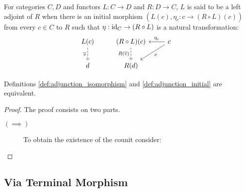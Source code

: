 \begin{definition}
  For categories $C,D$ and functors $L: C\to D$ and $R: D\to C$, $L$ is said to
  be a left adjoint of $R$ when there is an initial morphism $(L(c), \eta_c:c\to
  (R\circ L)(c))$ from every $c\in C$ to $R$ such that $\eta: \mathrm{id}_C \to (R\circ
  L)$ is a natural transformation:
  \parencite{awodey:category_theory}
  \[\begin{tikzcd}[ampersand replacement=\&]
    {L(c)} \& {(R\circ L)(c)} \& c \\
    d \& {R(d)}
    \arrow["{\overline{v}}"', dashed, from=1-1, to=2-1]
    \arrow["{R(\overline{v})}"', dashed, from=1-2, to=2-2]
    \arrow["v", from=1-3, to=2-2]
    \arrow["{\eta_c}"', from=1-3, to=1-2]
  \end{tikzcd}\]
\end{definition}

\begin{theorem}
  Definitions \ref{def:adjunction_isomorphism} and \ref{def:adjunction_initial}
  are equivalent.

  \begin{proof}
    The proof consists on two parts.
    \begin{description}
      \item[$(\implies)$] To obtain the existence of the counit consider:
    \end{description}
  \end{proof}
\end{theorem}

\subsection{Via Terminal Morphism}

